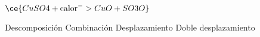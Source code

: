 $\ce{CuSO4 + \text{calor} ^ -> CuO + SO3O}$

\begin{choices}
    \CorrectChoice Descomposición
    \choice Combinación
    \choice Desplazamiento
    \choice Doble desplazamiento
\end{choices}